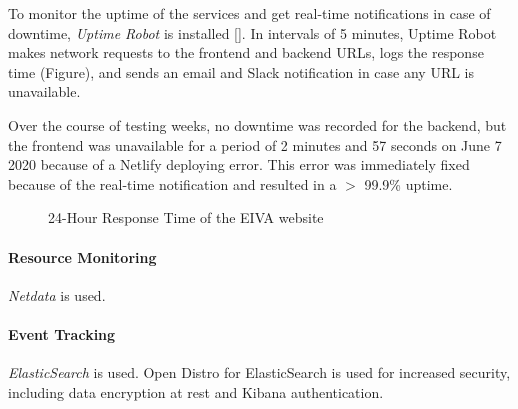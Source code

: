 \documentclass{article}
\begin{document}
To monitor the uptime of the services and get real-time notifications in case of downtime, \emph{Uptime Robot} is installed []. In intervals of 5 minutes, Uptime Robot makes network requests to the frontend and backend URLs, logs the response time (Figure), and sends an email and Slack notification in case any URL is unavailable.

Over the course of testing weeks, no downtime was recorded for the backend, but the frontend was unavailable for a period of 2 minutes and 57 seconds on June 7 2020 because of a Netlify deploying error. This error was immediately fixed because of the real-time notification and resulted in a $>$ 99.9\% uptime.

\begin{figure}
\centering
{}
\caption{24-Hour Response Time of the EIVA website}
\end{figure}

\paragraph{Resource Monitoring}

\emph{Netdata} is used.

\paragraph{Event Tracking}

\emph{ElasticSearch} is used. Open Distro for ElasticSearch is used for increased security, including data encryption at rest and Kibana authentication.
\end{document}
